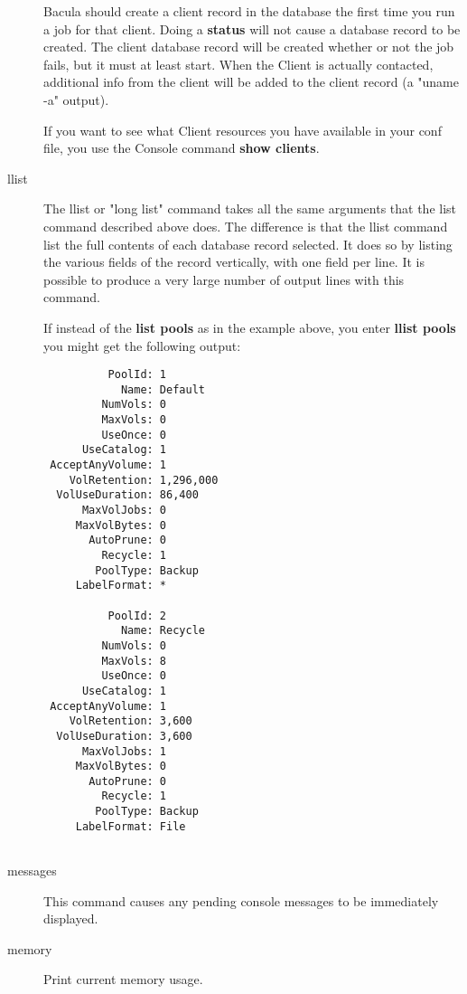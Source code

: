 \begin{description}
   Bacula should create a client record in the database the first time you
   run a job for that client.  Doing a {\bf status} will not cause a
   database record to be created.  The client database record will be
   created whether or not the job fails, but it must at least start.  When
   the Client is actually contacted, additional info from the client will
   be added to the client record (a "uname -a" output).

   If you want to see what Client resources you have available in your conf
   file, you use the Console command {\bf show clients}.

\item [llist]
   The llist or "long list" command takes all the same arguments that the
   list command described above does.  The difference is that the llist
   command list the full contents of each database record selected.  It
   does so by listing the various fields of the record vertically, with one
   field per line.  It is possible to produce a very large number of output
   lines with this command.

   If instead of the {\bf list pools} as in the example above, you enter
   {\bf llist pools} you might get the following output:

\footnotesize
\begin{verbatim}
          PoolId: 1
            Name: Default
         NumVols: 0
         MaxVols: 0
         UseOnce: 0
      UseCatalog: 1
 AcceptAnyVolume: 1
    VolRetention: 1,296,000
  VolUseDuration: 86,400
      MaxVolJobs: 0
     MaxVolBytes: 0
       AutoPrune: 0
         Recycle: 1
        PoolType: Backup
     LabelFormat: *

          PoolId: 2
            Name: Recycle
         NumVols: 0
         MaxVols: 8
         UseOnce: 0
      UseCatalog: 1
 AcceptAnyVolume: 1
    VolRetention: 3,600
  VolUseDuration: 3,600
      MaxVolJobs: 1
     MaxVolBytes: 0
       AutoPrune: 0
         Recycle: 1
        PoolType: Backup
     LabelFormat: File
      
\end{verbatim}
\normalsize

\item [messages]
   This command causes any pending  console messages to be immediately displayed.

\item [memory]
   Print current memory usage.
 


\end{description}
